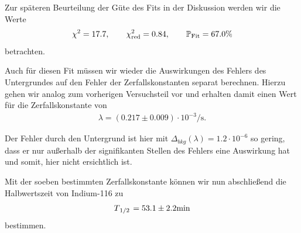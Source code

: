Zur späteren Beurteilung der Güte des Fits in der Diskussion werden wir die Werte
\begin{align}
    \chi^{2} = 17.7, \qquad \chi^{2}_{\mathrm{red}} = 0.84, \qquad \mathbb{P}_{\mathrm{Fit}} = 67.0\%
\end{align}
betrachten.

Auch für diesen Fit müssen wir wieder die Auswirkungen des Fehlers des Untergrundes auf den Fehler der Zerfallskonstanten separat berechnen. Hierzu gehen wir analog zum vorherigen Versuchsteil vor und erhalten damit einen Wert für die Zerfallskonstante von
\begin{align}
    \lambda = (0.217 \pm 0.009) \cdot 10^{-3} \si{\per\second}.
\end{align}

Der Fehler durch den Untergrund ist hier mit $\Delta_{bkg}(\lambda) = 1.2 \cdot 10^{-6}$ so gering, dass er nur außerhalb der signifikanten Stellen des Fehlers eine Auswirkung hat und somit, hier nicht ersichtlich ist.

Mit der soeben bestimmten Zerfallskonstante können wir nun abschließend die Halbwertszeit von Indium-116 zu
\begin{align}
    T_{\flatfrac{1}{2}} = 53.1 \pm 2.2\si{\minute}
\end{align}
bestimmen.